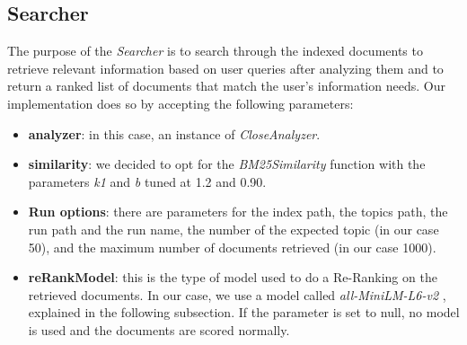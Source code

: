 \subsection{Searcher} \label{searcher_subsec}
The purpose of the \textit{Searcher} is to search through the indexed documents to retrieve relevant information based on user queries after analyzing them and to
return a ranked list of documents that match the user’s information needs.
\newline
Our implementation does so by accepting the following parameters:
\begin{itemize}
  \item \textbf{analyzer}: in this case, an instance of \textit{CloseAnalyzer}.
  \item \textbf{similarity}: we decided to opt for the \textit{BM25Similarity} \cite{lucenebm25similarity} function with the parameters \textit{k1} and \textit{b} tuned at 1.2 and 0.90.
  \item \textbf{Run options}: there are parameters for the index path, the topics path, the run path and the run name, the number of the expected topic (in our case 50), and the maximum number of documents retrieved (in our case 1000).
  \item \textbf{reRankModel}: this is the type of model used to do a Re-Ranking on the retrieved documents. 
  In our case, we use a model called \textit{all-MiniLM-L6-v2} \cite{huggingfaceallminilml6v2}, explained in the following subsection. 
  If the parameter is set to null, no model is used and the documents are scored normally.
\end{itemize}


